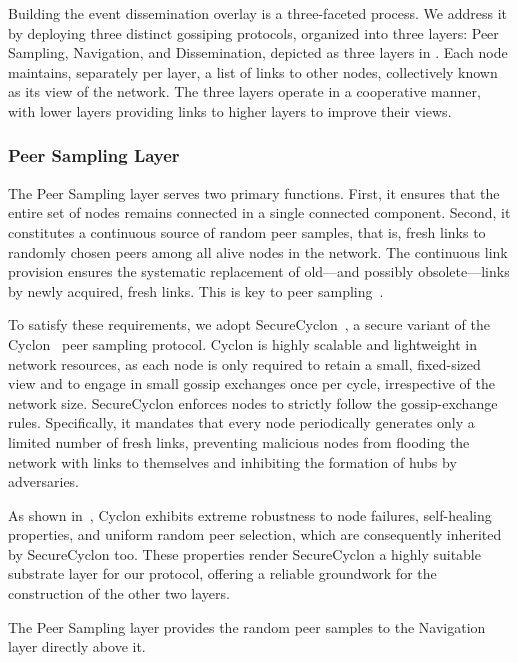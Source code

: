 Building the event dissemination overlay is a three-faceted process.
We address it by deploying three distinct gossiping protocols, organized into three layers: Peer Sampling, Navigation, and Dissemination, depicted as three layers in .
Each node maintains, separately per layer, a list of links to other nodes, collectively known as its view of the network.
The three layers operate in a cooperative manner, with lower layers providing links to higher layers to improve their views.

\subsubsection{Peer Sampling Layer}
\label{subsubsec:peer-sampling-layer}

The Peer Sampling layer serves two primary functions.
First, it ensures that the entire set of nodes remains connected in a single connected component.
Second, it constitutes a continuous source of random peer samples, that is, fresh links to randomly chosen peers among all alive nodes in the network.
The continuous link provision ensures the systematic replacement of old---and possibly obsolete---links by newly acquired, fresh links.
This is key to peer sampling~\cite{PeerSampling}.

To satisfy these requirements, we adopt SecureCyclon~\cite{SecureCyclon}, a secure variant of the Cyclon~\cite{Cyclon} peer sampling protocol.
Cyclon is highly scalable and lightweight in network resources, as each node is only required to retain a small, fixed-sized view and to engage in small gossip exchanges once per cycle, irrespective of the network size.
SecureCyclon enforces nodes to strictly follow the gossip-exchange rules.
Specifically, it mandates that every node periodically generates only a limited number of fresh links, preventing malicious nodes from flooding the network with links to themselves and inhibiting the formation of hubs by adversaries.

As shown in~\cite{Cyclon}, Cyclon exhibits extreme robustness to node failures, self-healing properties, and uniform random peer selection, which are consequently inherited by SecureCyclon too.
These properties render SecureCyclon a highly suitable substrate layer for our protocol, offering a reliable groundwork for the construction of the other two layers.

The Peer Sampling layer provides the random peer samples to the Navigation layer directly above it.

